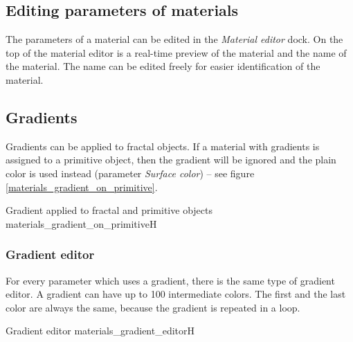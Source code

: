 \subsection{Editing parameters of materials}\label{materials-parameters}

The parameters of a material can be edited in the \emph{Material editor} dock. On the top of the material editor is a real-time preview of the material and the name of the material. The name can be edited freely for easier identification of the material.

\subsection{Gradients}\label{materials-gradients}

Gradients can be applied to fractal objects. If a material with gradients is assigned to a primitive object, then the gradient will be ignored and the plain color is used instead (parameter \emph{Surface color}) -- see figure \ref{materials_gradient_on_primitive}.

{Gradient applied to fractal and primitive objects}
{materials_gradient_on_primitive}{H}

\subsubsection{Gradient editor}\label{materials-gradient-editor}

For every parameter which uses a gradient, there is the same type of gradient editor. A gradient can have up to 100 intermediate colors. The first and the last color are always the same, because the gradient is repeated in a loop.

{Gradient editor}
{materials_gradient_editor}{H}

